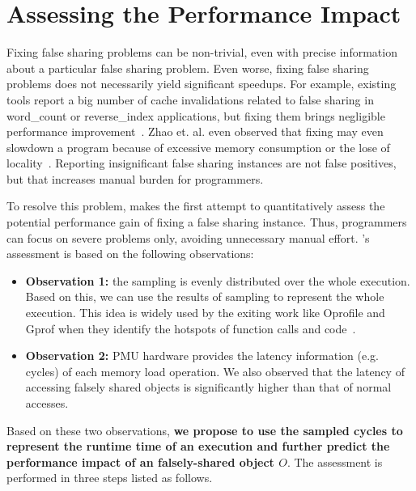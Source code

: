 \section{Assessing the Performance Impact}

\label{sec:predictimprove}

Fixing false sharing problems can be non-trivial, even with precise information about a particular false sharing problem. Even worse, fixing false sharing problems does not necessarily yield significant speedups. 
 For example, existing tools report a big number of cache invalidations related to false sharing in word\_count or reverse\_index applications, but fixing them brings negligible performance improvement~\cite{Sheriff, Predator}. Zhao et. al. even observed that fixing may even slowdown a program because of excessive memory consumption or the lose of locality~\cite{qinzhao}. Reporting insignificant false sharing instances are not false positives, but that increases manual burden for programmers.

To resolve this problem, \cheetah{} makes the first attempt to quantitatively assess the potential performance gain of fixing a false sharing instance. Thus, programmers can focus on severe problems only, avoiding unnecessary manual effort.
\cheetah{}'s assessment is based on the following observations:
\begin{itemize}
\item {\bf Observation 1:} the sampling is evenly distributed over the whole execution. Based on this, we can  use the results of sampling to represent the whole execution. This idea is widely used by the exiting work like Oprofile and Gprof when they identify the hotspots of function calls and code~\cite{oprofile, DBLP:conf/sigplan/GrahamKM82}.

\item {\bf Observation 2:} PMU hardware provides the latency information (e.g. cycles) of each memory load operation. We also observed that the latency of accessing falsely shared objects is significantly higher than that of normal accesses. 

\end{itemize}
Based on these two observations, {\bf we propose to use the sampled cycles to represent the runtime time of an execution and further predict the performance impact of an falsely-shared object $O$}. The assessment is performed in three steps listed as follows. 

